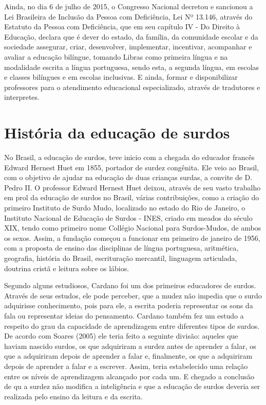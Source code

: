 \documentclass[brasil]{abnt}
\begin{document}
		Ainda, no dia 6 de julho de 2015, o Congresso Nacional decretou e sancionou a Lei Brasileira de Inclusão da Pessoa com Deficiência, Lei Nº 13.146, através do Estatuto da Pessoa com Deficiência, que em seu 
		capítulo IV - Do Direito à Educação, declara que é dever do estado, da família, da comunidade escolar e da sociedade assegurar, criar, desenvolver, implementar, incentivar, acompanhar e avaliar a 
		educação bilíngue, tomando Libras como primeira língua e na modalidade escrita a língua portuguesa, sendo esta, a segunda língua, em escolas e classes bilíngues e em escolas inclusivas. E ainda, formar
		e disponibilizar professores para o atendimento educacional especializado, através de tradutores e interpretes.   
				

\chapter{História da educação de surdos}
	
	No Brasil, a educação de surdos, teve inicio com a chegada do educador francês Edward Hernest Huet em 1855, portador de surdez congênita. Ele veio ao Brasil, com o objetivo de ajudar na educação de duas 
	crianças surdas, a convite de D. Pedro II. O professor Edward Hernest Huet deixou, através de seu vasto trabalho em prol da educação de surdos no Brasil, várias contribuições, como a criação do primeiro 
	Instituto de Surdo Mudo, localizado no estado do Rio de Janeiro, o Instituto Nacional de Educação de Surdos - INES, criado em meados do século 
	XIX, tendo como primeiro nome Collégio Nacional para Surdos-Mudos, de ambos os sexos. Assim, a fundação começou a funcionar em primeiro de janeiro de 1956, com a proposta de ensino das disciplinas de língua 
	portuguesa, aritmética, geografia, história do Brasil, escrituração mercantil, linguagem articulada, doutrina cristã e leitura sobre os lábios.    	
	
	Segundo alguns estudiosos, Cardano foi um dos primeiros educadores de surdos. Através de seus estudos, ele pode perceber, que a mudez não impedia que o surdo adquirisse conhecimento, pois para ele, a 
	escrita poderia representar os sons da fala ou representar ideias do pensamento. 
	Cardano também fez um estudo a respeito do grau da capacidade de 
	aprendizagem entre diferentes tipos de surdos. De acordo com Soares 
	(2005) ele teria feito a seguinte divisão: aqueles que haviam 
	nascido surdos, os que adquiriram a surdez antes de aprender a falar, os que a adquiriram depois de aprender a falar e, finalmente, os que a adquiriram depois de aprender a falar e a escrever. 
	Assim, teria estabelecido uma relação entre os níveis de 
	aprendizagem alcançado por cada um. E chegado a conclusão de qu a surdez não modifica a inteligência e que a educação de surdos deveria ser 
	realizada pelo ensino da leitura e da escrita.
	
\end{document}
